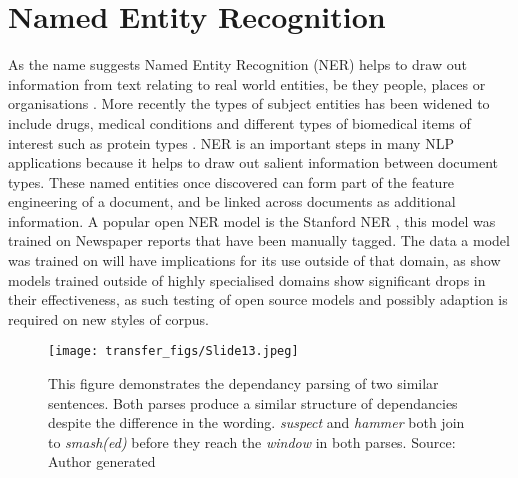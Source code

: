 \section{Named Entity Recognition} As the name suggests Named Entity Recognition (NER) helps to draw out information from text relating to real world entities, be they people, places or organisations \parencite{eisenstein2018natural}. More recently the types of subject entities has been widened to include drugs, medical conditions and different types of biomedical items of interest such as protein types \parencite{goyal2018recent}. NER is an important steps in many NLP applications because it helps to draw out salient information between document types. These named entities once discovered can form part of the feature engineering of a document, and be linked across documents as additional information. A popular open NER model is the Stanford NER \parencite{finkel2005incorporating}, this model was trained on Newspaper reports that have been manually tagged.  The data a model was trained on will have implications for its use outside of that domain, as \textcite{prokofyev2014effective} show models trained outside of highly specialised domains show significant drops in their effectiveness, as such testing of open source models and possibly adaption is required on new styles of corpus.


\begin{figure}
  \texttt{[image: transfer\_figs/Slide13.jpeg]}
  \caption[Sentence Dependancy Parse.]{This figure demonstrates the dependancy parsing of two similar sentences. Both parses produce a similar structure of dependancies despite the difference in the wording. \emph{suspect} and \emph{hammer} both join to \emph{smash(ed)} before they reach the \emph{window} in both parses. Source: Author generated}
  \label{fig:dep}
\end{figure}


